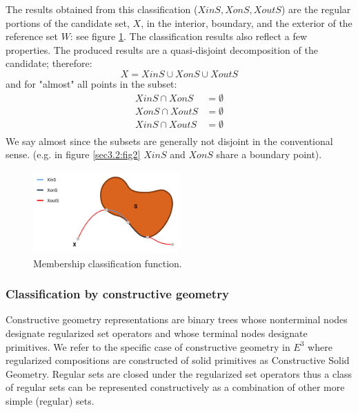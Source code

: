 \documentclass[a4paper,11pt,oneside]{article}
\begin{document}
The results obtained from this classification ($XinS, XonS, XoutS$) are the regular portions of the candidate set, $X$, in the interior, boundary, and the exterior of the reference set $W$: see figure \ref{sect3:membership_classification}.
The classification results also reflect a few properties. The produced results are a quasi-disjoint decomposition of the candidate; therefore:
\begin{equation}
	X = XinS \cup XonS \cup XoutS
\end{equation}
and for "almost" all points in the subset:
\begin{align*}
	XinS \cap XonS  & = \emptyset \\
	XonS \cap XoutS & = \emptyset \\
	XinS \cap XoutS & = \emptyset \\
\end{align*}
We say almost since the subsets are generally not disjoint in the conventional sense. (e.g. in figure \ref{sec3.2:fig2} $XinS$ and $XonS$ share a boundary point).



\begin{figure}[ht]
	\begin{center}
		\includegraphics[width=0.5\textwidth]{section3/3.2/membership_classification.png}
	\end{center}
	\caption{Membership classification function.}
	\label{sect3:membership_classification}
\end{figure}

\subsubsection{Classification by constructive geometry}

Constructive geometry representations are binary trees whose nonterminal nodes designate regularized set operators and whose terminal nodes designate primitives.  We refer to the specific case of constructive geometry in $E^3$ where regularized compositions are constructed of solid primitives as Constructive Solid Geometry. Regular sets are closed under the regularized set operators thus a class of regular sets can be represented constructively as a combination of other more simple (regular) sets.
\end{document}
